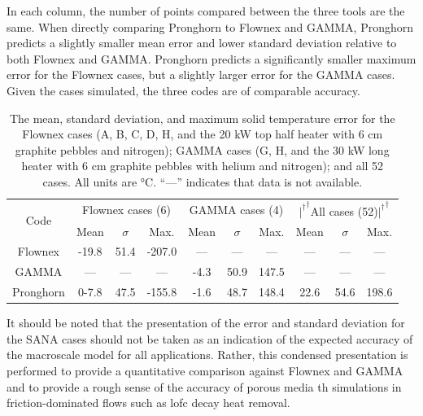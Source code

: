 In each column, the number of points compared between the three tools are the same. When directly comparing Pronghorn to Flownex and GAMMA, Pronghorn predicts a slightly smaller mean error and lower standard deviation relative to both Flownex and GAMMA. Pronghorn predicts a significantly smaller maximum error for the Flownex cases, but a slightly larger error for the GAMMA cases. Given the cases simulated, the three codes are of comparable accuracy. 

\begin{table}[h!]
\caption{The mean, standard deviation, and maximum solid temperature error for the Flownex cases (A, B, C, D, H, and the 20 \si{\kilo\watt} top half heater with 6 \si{\centi\meter} graphite pebbles and nitrogen); GAMMA cases (G, H, and the 30 \si{\kilo\watt} long heater with 6 \si{\centi\meter} graphite pebbles with helium and nitrogen); and all 52 cases. All units are \si{\celsius}. ``---'' indicates that data is not available.}
\centering
\begin{tabular}{|c |c c c |c c c |c c c|}
\hline\hline
\multicolumn{1}{|c|}{\multirow{2}{*}{Code}} & \multicolumn{3}{c}{Flownex cases (6)} & \multicolumn{3}{c}{GAMMA cases (4)} & \multicolumn{3}{c|}{\color{white}${\rvert^\dagger}^\dagger$\color{black}All cases (52)\color{white}${\rvert^\dagger}^\dagger$\color{black}}\Bstrut\\ \cline{2-10}
 & Mean & \(\sigma\) & Max. & Mean & \(\sigma\) & Max. & Mean & \(\sigma\) & Max.\Tstrut\Bstrut\\
\hline
Flownex & \color{white}-\color{black}19.8 & 51.4 & \color{white}-\color{black}207.0 & --- & --- & --- & --- & --- & ---\Tstrut\\
GAMMA & --- & --- & --- & \color{white}-\color{black}4.3 & 50.9 & 147.5 & --- & --- & ---\\
Pronghorn & \color{white}0\color{black}-7.8 & 47.5 & -155.8 & -1.6 & 48.7 & 148.4 & 22.6 & 54.6 & 198.6\Bstrut\\
\hline
\end{tabular}
\label{table:stats}
\end{table}

It should be noted that the presentation of the error and standard deviation for the SANA cases should not be taken as an indication of the expected accuracy of the macroscale model for all applications. Rather, this condensed presentation is performed to provide a quantitative comparison against Flownex and GAMMA and to provide a rough sense of the accuracy of porous media \gls{th} simulations in friction-dominated flows such as \gls{lofc} decay heat removal.

